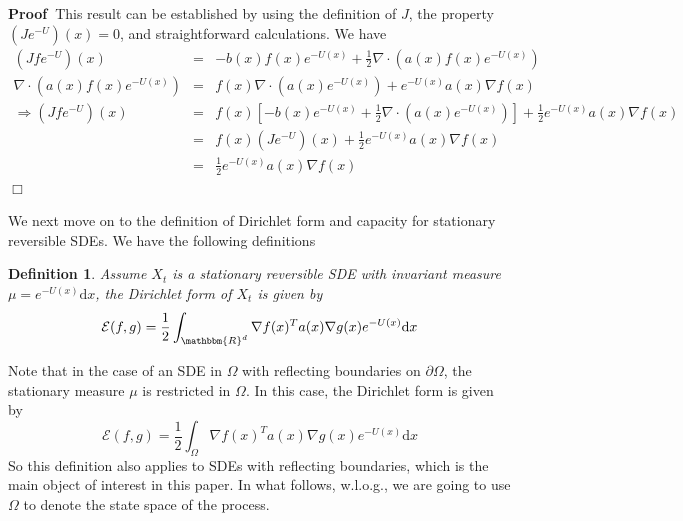\documentclass[english, aip, jcp, priprint, graphicx]{revtex4-1}
\newtheorem{definition}{Definition}
\theoremstyle{plain}
\theoremstyle{definition}
\theoremstyle{plain}
\begin{document}
\noindent\textbf{Proof\ }This result can be established by using the
definition of $J$, the property $(J e^{- U })(x) = 0$, and straightforward
calculations. We have
\begin{eqnarray*}
(J f e^{- U })(x) & = & - b (x) f (x) e^{- U (x)} + \frac{1}{2} \nabla
\cdot (a (x) f (x) e^{- U (x)})\\
\nabla \cdot (a (x) f (x) e^{- U (x)}) & = & f (x) \nabla \cdot (a (x) e^{-
U (x)}) + e^{- U (x)} a (x) \nabla f (x)\\
\Longrightarrow (J f e^{- U })(x) & = & f (x) \left[ - b (x) e^{- U (x)}
+ \frac{1}{2} \nabla \cdot (a (x) e^{- U (x)}) \right] + \frac{1}{2} e^{- U
(x)} a (x) \nabla f (x)\\
& = & f (x) (J e^{- U })(x) + \frac{1}{2} e^{- U (x)} a (x) \nabla f (x)\\
& = & \frac{1}{2} e^{- U (x)} a (x) \nabla f (x)
\end{eqnarray*}\hspace*{\fill}$\Box$\medskip

We next move on to the definition of Dirichlet form and capacity for
stationary reversible SDEs. We have the following definitions

\begin{definition}
Assume $X_t$ is a stationary reversible SDE with invariant measure
${\mu}= e^{- U (x)} \mathrm{d} x$, the Dirichlet form of $X_t$ is given
by
\[ \mathcal{E} (f, g) = \frac{1}{2} \int_{\mathbbm{R}^d} \nabla f (x)^T a
(x) \nabla g (x) e^{- U (x)} \mathrm{d} x \]
\end{definition}

Note that in the case of an SDE in $\Omega$ with reflecting boundaries on
$\partial \Omega$, the stationary measure ${\mu}$ is restricted in
$\Omega$. In this case, the Dirichlet form is given by
\[ \mathcal{E} (f, g) = \frac{1}{2} \int_{\Omega} \nabla f (x)^T a (x) \nabla
g (x) e^{- U (x)} \mathrm{d} x \]
So this definition also applies to SDEs with reflecting boundaries, which is
the main object of interest in this paper. In what follows, w.l.o.g., we are
going to use $\Omega$ to denote the state space of the process.
\end{document}
